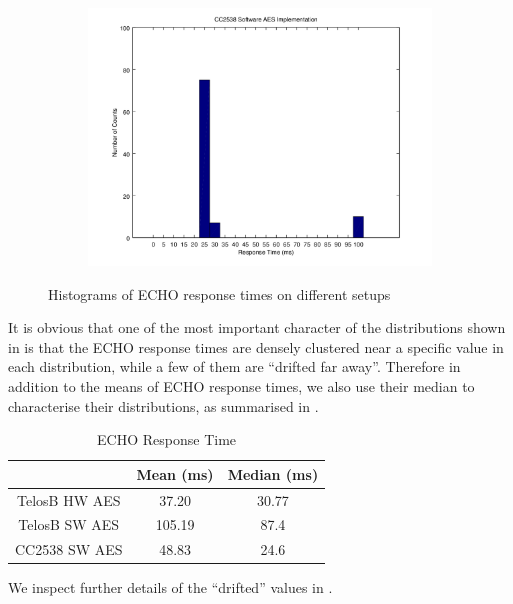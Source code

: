 \begin{figure}[ht!]
\begin{subfigure}{.5\textwidth}
		\includegraphics[width=1\linewidth]{fig/noncoresec_ping_cc2538_sw.png}
	\end{subfigure}
	\caption{Histograms of ECHO response times on different setups}
	\label{Fig: Histograms of ECHO response times on different setups}
\end{figure}

It is obvious that one of the most important character of the distributions shown in  is that the ECHO response times are densely clustered near a specific value in each distribution, while a few of them are ``drifted far away''. Therefore in addition to the means of ECHO response times, we also use their median to characterise their distributions, as summarised in .

\begin{table}[ht!]
	\center
	\begin{tabular}{|c|c|c|}
		\hline
		              & Mean (ms)     & Median (ms)   \\ \hline
		TelosB HW AES & 37.20 & 30.77 \\ \hline
		TelosB SW AES & 105.19        & 87.4          \\ \hline
		CC2538 SW AES & 48.83         & 24.6          \\ \hline
	\end{tabular}
	\caption{ECHO Response Time}
	\label{Tbl: ECHO Response Time}
\end{table}

We inspect further details of the ``drifted'' values in .

